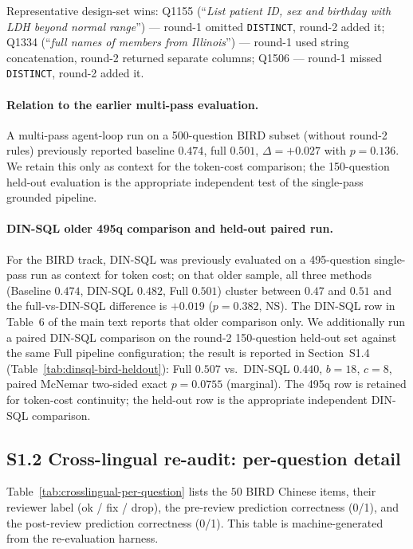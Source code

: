 \documentclass[11pt]{article}
\begin{document}
Representative design-set wins: Q1155 (``\emph{List patient ID, sex and birthday with
LDH beyond normal range}'') --- round-1 omitted \texttt{DISTINCT}, round-2 added it;
Q1334 (``\emph{full names of members from Illinois}'') --- round-1 used string
concatenation, round-2 returned separate columns; Q1506 --- round-1 missed
\texttt{DISTINCT}, round-2 added it.

\paragraph{Relation to the earlier multi-pass evaluation.} A multi-pass agent-loop
run on a 500-question BIRD subset (without round-2 rules) previously reported
baseline $0.474$, full $0.501$, $\Delta=+0.027$ with $p=0.136$. We retain this only
as context for the token-cost comparison; the 150-question held-out evaluation is
the appropriate independent test of the single-pass grounded pipeline.

\paragraph{DIN-SQL older 495q comparison and held-out paired run.} For the BIRD
track, DIN-SQL was previously evaluated on a 495-question single-pass run as
context for token cost; on that older sample, all three methods (Baseline $0.474$,
DIN-SQL $0.482$, Full $0.501$) cluster between $0.47$ and $0.51$ and the
full-vs-DIN-SQL difference is $+0.019$ ($p=0.382$, NS). The DIN-SQL row in
Table~6 of the main text reports that older comparison only. We additionally
run a paired DIN-SQL comparison on the round-2 150-question held-out set against
the same Full pipeline configuration; the result is reported in Section~S1.4
(Table~\ref{tab:dinsql-bird-heldout}): Full $0.507$ vs.\ DIN-SQL $0.440$, $b=18$,
$c=8$, paired McNemar two-sided exact $p=0.0755$ (marginal). The 495q row is
retained for token-cost continuity; the held-out row is the appropriate independent
DIN-SQL comparison.

\subsection*{S1.2 Cross-lingual re-audit: per-question detail}

Table~\ref{tab:crosslingual-per-question} lists the $50$ BIRD Chinese items, their
reviewer label (ok / fix / drop), the pre-review prediction correctness (0/1), and
the post-review prediction correctness (0/1). This table is machine-generated from
the re-evaluation harness.
\end{document}
